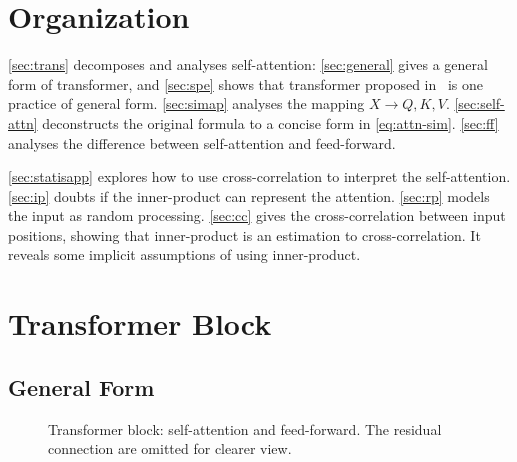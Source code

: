\documentclass[final]{cvpr}
\begin{document}
\section{Organization}
\autoref{sec:trans} decomposes and analyses self-attention: \autoref{sec:general} gives a general form of transformer, and \autoref{sec:spe} shows that transformer proposed in~\cite{vaswani2017attention} is one practice of general form. \autoref{sec:simap} analyses the mapping $X\to Q,K,V$. \autoref{sec:self-attn} deconstructs the original formula to a concise form in \autoref{eq:attn-sim}. \autoref{sec:ff} analyses the difference between self-attention and feed-forward.

\autoref{sec:statisapp} explores how to use cross-correlation to interpret the self-attention. \autoref{sec:ip} doubts if the inner-product can represent the attention. \autoref{sec:rp} models the input as random processing. \autoref{sec:cc} gives the cross-correlation between input positions, showing that inner-product is an estimation to cross-correlation. It reveals some implicit assumptions of using inner-product.

\section{Transformer Block}
\label{sec:trans}

\subsection{General Form}
\label{sec:general}
\begin{figure}[ht]
\begin{center}
\end{center}
   \caption{Transformer block: self-attention and feed-forward. The residual connection are omitted for clearer view.
   }
\label{fig:transformerover}
\end{figure}
\end{document}
